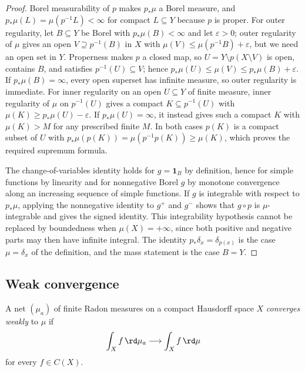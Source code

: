 \begin{proof}
Borel measurability of $p$ makes $p_*\mu$ a Borel measure, and
$p_*\mu(L)=\mu(p^{-1}L)<\infty$ for compact $L\subseteq Y$ because $p$ is
proper.  For outer regularity, let $B\subseteq Y$ be Borel with
$p_*\mu(B)<\infty$ and let $\varepsilon>0$; outer regularity of $\mu$ gives an open
$V\supseteq p^{-1}(B)$ in $X$ with $\mu(V)\leq\mu(p^{-1}B)+\varepsilon$, but
we need an open set in $Y$.  Properness makes $p$ a closed map, so
$U=Y\setminus p(X\setminus V)$ is open, contains $B$, and satisfies
$p^{-1}(U)\subseteq V$; hence
$p_*\mu(U)\leq\mu(V)\leq p_*\mu(B)+\varepsilon$.  If $p_*\mu(B)=\infty$,
every open superset has infinite measure, so outer regularity is immediate.
For inner regularity on an open $U\subseteq Y$ of finite measure, inner
regularity of $\mu$ on $p^{-1}(U)$ gives a compact
$K\subseteq p^{-1}(U)$ with $\mu(K)\geq p_*\mu(U)-\varepsilon$.
If $p_*\mu(U)=\infty$, it instead gives such a compact $K$ with
$\mu(K)>M$ for any prescribed finite $M$.  In both cases $p(K)$ is
a compact subset of $U$ with $p_*\mu(p(K))=\mu(p^{-1}p(K))\geq\mu(K)$,
which proves the required supremum formula.

The change-of-variables identity holds for $g=\mathbf 1_B$ by definition,
hence for simple functions by linearity and for nonnegative Borel $g$ by
monotone convergence along an increasing sequence of simple functions.  If
$g$ is integrable with respect to $p_*\mu$, applying the nonnegative identity
to $g^+$ and $g^-$ shows that $g\circ p$ is $\mu$-integrable and gives the
signed identity.  This integrability hypothesis cannot be replaced by
boundedness when $\mu(X)=+\infty$, since both positive and negative parts may
then have infinite integral.  The
identity $p_*\delta_x=\delta_{p(x)}$ is the case $\mu=\delta_x$ of the
definition, and the mass statement is the case $B=Y$.
\end{proof}

\subsection{Weak convergence}

\begin{definition}
\label{def:weak-convergence}
A net $(\mu_a)$ of finite Radon measures on a compact Hausdorff space $X$
\emph{converges weakly} to $\mu$ if
\[
                         \int_X f\,\rd \mu_a\longrightarrow
                         \int_X f\,\rd \mu
\]
for every $f\in C(X)$.
\end{definition}

